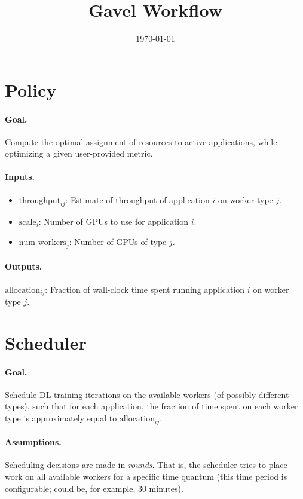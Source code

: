 \documentclass{article}
\title{Gavel Workflow}
\date{\today}
\begin{document}
\maketitle

\section{Policy}

\paragraph{Goal.} Compute the optimal assignment of resources to active applications,
while optimizing a given user-provided metric.

\paragraph{Inputs.}

\begin{itemize}
\item $\text{throughput}_{ij}$: Estimate of throughput of application
$i$ on worker type $j$.

\item $\text{scale}_i$: Number of GPUs to use for application $i$.

\item $\text{num\_workers}_j$: Number of GPUs of type $j$.

\end{itemize}

\paragraph{Outputs.} $\text{allocation}_{ij}$: Fraction of wall-clock time spent
running application $i$ on worker type $j$.


\section{Scheduler}

\paragraph{Goal.} Schedule DL training iterations on the available workers (of
possibly different types), such that for each application, the fraction of time
spent on each worker type is approximately equal to $\text{allocation}_{ij}$.

\paragraph{Assumptions.} Scheduling decisions are made in \emph{rounds}. That is,
the scheduler tries to place work on all available workers for a specific time
quantum (this time period is configurable; could be, for example, 30 minutes).
\end{document}
